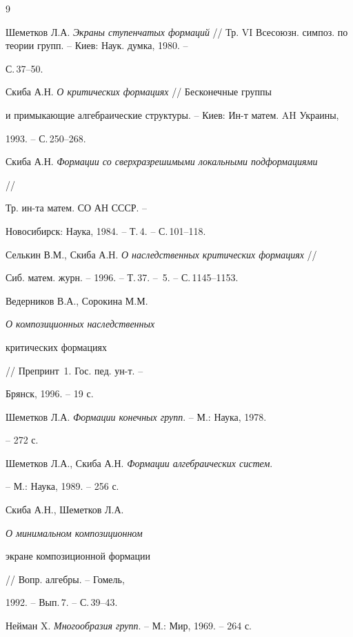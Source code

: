 \begin{thebibliography}{9} 


 




Шеметков Л.А. {\em Экраны ступенчатых формаций} // Тр. VI
Всесоюзн. симпоз. по теории групп. -- Киев: Наук. думка, 1980. -- 


С.\,37--50. 




Скиба А.Н. {\em О критических формациях} // Бесконечные группы 


и примыкающие алгебраические структуры. -- Киев: Ин-т матем. AH Украины, 


1993. -- С.\,250--268. 




Скиба А.Н. {\em Формации со сверхразрешимыми локальными подформациями} 


// 


Тр. ин-та матем. СО АН СССР. -- 


Новосибирск: Наука, 1984. -- Т.\,4. -- С.\,101--118. 




Селькин В.М., Скиба А.Н. {\em О наследственных критических формациях} // 


Сиб. матем. журн. -- 1996. -- Т.\,37. -- \No\,5. -- С.\,1145--1153. 




Ведерников В.А., Сорокина М.М. {\em О композиционных наследственных 


критических формациях} // Препринт \No\,1. Гос. пед. ун-т. -- 


Брянск, 1996. -- 19 с. 




Шеметков Л.А. {\em Формации конечных групп}. -- М.: Наука, 1978. 


-- 272 с. 




Шеметков Л.А., Скиба А.Н. {\em Формации алгебраических систем}. 


-- М.: Наука, 1989. -- 256 с. 




Скиба А.Н., Шеметков Л.А. {\em О минимальном композиционном 


экране композиционной формации} // Вопр. алгебры. -- Гомель,


1992. -- Вып.\,7. -- С.\,39--43. 




Нейман X. {\em Многообразия групп}. -- М.: Мир, 1969. -- 264 с. 


 


\end{thebibliography} 


 


\vskip 2cm 


 






 


\label{end} 


 



